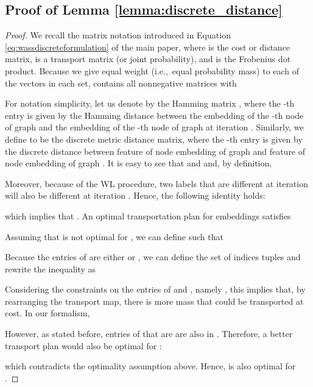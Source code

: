 \documentclass{article}
\begin{document}
\subsection{Proof of Lemma \ref{lemma:discrete_distance}}
\label{proof:discrete_distance}
\begin{proof}
We recall the matrix notation introduced in Equation \ref{eq:wassdiscreteformulation} of the main paper, where  is the cost or distance matrix,  is a transport matrix (or joint probability), and  is the Frobenius dot product.
Because we give equal weight (i.e.,\ equal probability mass) to each of the vectors in each set,  contains all nonnegative  matrices  with

  For notation simplicity, let us denote by  the Hamming matrix , where the -th entry is given by the Hamming distance between the embedding of the -th node of graph  and the embedding of the -th node of graph  at iteration . 
Similarly, we define  to be the discrete metric distance matrix, where the -th entry is given by the discrete distance between feature  of node embedding  of graph  and feature  of node embedding  of graph .
  It is easy to see that  and  and, by definition,


Moreover, because of the WL procedure, two labels that are different at iteration  will also be different at iteration . Hence, the following identity holds:

which implies that . 
An optimal transportation plan  for  embeddings satisfies

Assuming that  is not optimal for , we can define  such that

Because the entries of  are either  or , we can define the set of indices tuples  and rewrite the inequality as

Considering the constraints on the entries of  and , namely , this implies that, by rearranging the transport map, there is more mass that could be transported at  cost. In our formalism,

However, as stated before, entries of  that are  are also  in . Therefore, a better transport plan  would also be optimal for :

which contradicts the optimality assumption above. Hence,  is also optimal for .

\end{proof}
\end{document}
